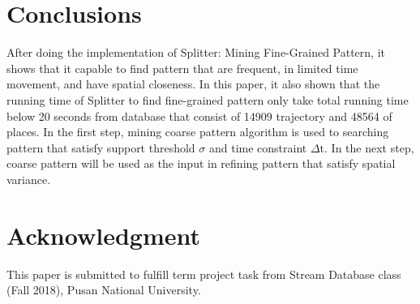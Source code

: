 \documentclass[conference]{IEEEtran}
\begin{document}
\section{Conclusions}
After doing the implementation of Splitter: Mining Fine-Grained Pattern, it shows that it capable to find pattern that are frequent, in limited time movement, and have spatial closeness. In this paper, it also shown that the running time of Splitter to find fine-grained pattern only take total running time below 20 seconds from database that consist of 14909 trajectory and 48564 of places. In the first step, mining coarse pattern algorithm is used to searching pattern that satisfy support threshold $\sigma$ and time constraint $\Delta$t. In the next step, coarse pattern will be used as the input in refining pattern that satisfy spatial variance.   

\section*{Acknowledgment}
This paper is submitted to fulfill term project task from Stream Database class (Fall 2018), Pusan National University.



\end{document}
